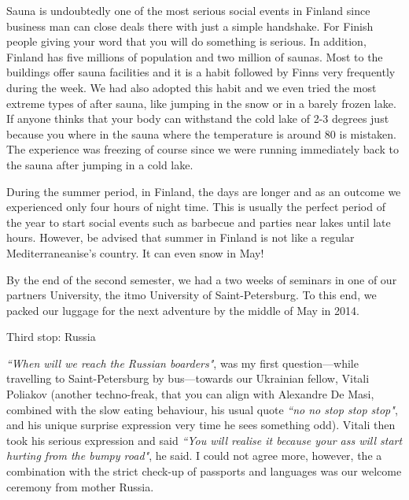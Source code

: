 \documentclass[10pt,a4paper]{article} %
\newcommand{\NewsItem}[1]{ %
\usefont{T1}{fvs}{n}{n} %
\vspace{24pt}\large #1\vspace{3pt} %
\par \normalsize \normalfont}
\begin{document}
\begin{multicols}{3}
Sauna is undoubtedly one of the most serious social events in Finland since business 
man can close deals there with just a simple handshake. 
For Finish people giving your word that you will do something is serious. 
In addition, Finland has five millions of population and two million of saunas. 
Most to the buildings offer sauna facilities and it is a habit followed by Finns 
very frequently during the week. 
We had also adopted this habit and we even tried the most extreme types of after 
sauna, like jumping in the snow or in a barely frozen lake. 
If anyone thinks that your body can withstand the cold lake of 2-3 degrees just 
because you where in the sauna where the temperature is around 80 is mistaken. 
The experience was freezing of course since we were running immediately back to the 
sauna after jumping in a cold lake.  


During the summer period, in Finland, the days are longer and as an outcome we 
experienced only four hours of night time. 
This is usually the perfect period of the year to start social events such as 
barbecue and parties near lakes until late hours. 
However, be advised that summer in Finland is not like a regular Mediterraneanise's 
country. 
It can even snow in May! 


By the end of the second semester, we had a two weeks of seminars in one of our 
partners University, the {\sc itmo} University of Saint-Petersburg. 
To this end, we packed our luggage for the next adventure by the middle of May 
in 2014.	

\NewsItem{Third stop: Russia}
%  
\textit{``When will we reach the Russian boarders"}, was my first question---while 
travelling to Saint-Petersburg by bus---towards our Ukrainian fellow, Vitali Poliakov 
(another techno-freak, that you can align with Alexandre De Masi, combined with 
the slow eating behaviour, his usual quote \textit{``no no stop stop stop"}, and  
his unique surprise expression very time he sees something odd). 
Vitali then took his serious expression and said \textit{``You will realise it 
	because your ass will start hurting from the bumpy road"}, he said. 
I could not agree more, however, the a combination with the strict check-up of 
passports and languages was our welcome ceremony from mother Russia.



\end{multicols}
\end{document}
